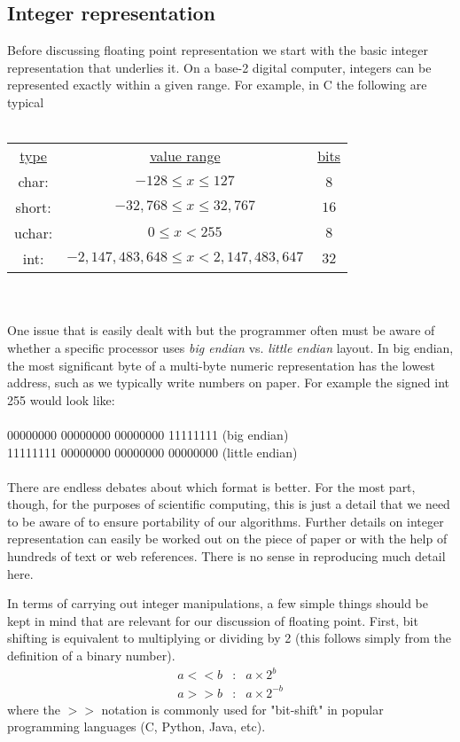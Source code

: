 \documentclass[11pt]{article}
\begin{document}
\subsection{Integer representation}
Before discussing floating point representation we start with the
basic integer representation that underlies it.  On a base-2 digital
computer, integers can be represented exactly within a given
range. For example, in C the following are typical \\ \\
\begin{tabular}{c c c}
\underline{type} & \underline{value range} & \underline{bits} \\
char: & $-128 \le x \le 127$  &  8\\
short: & $-32,768 \le x \le 32,767$  & $16$ \\
uchar:  & $0 \le x < 255$  & $8$ \\
int: & $-2,147,483,648 \le x < 2,147,483,647$  & $32$ \\
\end{tabular}
\\ \\
One issue that is easily dealt with but the programmer often must be
aware of whether a specific processor uses {\em big endian} vs. {\em
  little endian} layout. In big endian, the most significant byte of a
multi-byte numeric representation has the lowest address, such as we
typically write numbers on paper. For example the signed int 255 would
look like: \\ \\ 00000000 00000000 00000000 11111111 (big endian)
\\ 11111111 00000000 00000000 00000000 (little endian) \\ \\ There are
endless debates about which format is better. For the most part,
though, for the purposes of scientific computing, this is just a
detail that we need to be aware of to ensure portability of our
algorithms. Further details on integer representation can easily be
worked out on the piece of paper or with the help of hundreds of text
or web references. There is no sense in reproducing much detail here.

In terms of carrying out integer manipulations, a few simple things
should be kept in mind that are relevant for our discussion of
floating point. First, bit shifting is equivalent to multiplying or
dividing by 2 (this follows simply from the definition of a binary
number).
\begin{eqnarray}
a << b &:& a\times2^b  \\ \nonumber
a >> b &:& a\times2^{-b} \nonumber
\end{eqnarray}
where the $>>$ notation is commonly used for "bit-shift" in popular
programming languages (C, Python, Java, etc).
\end{document}
